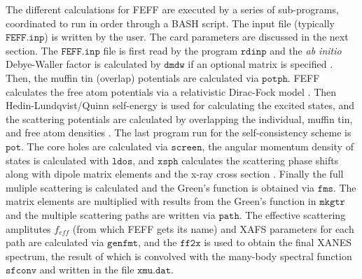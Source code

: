 The different calculations for FEFF are executed by a series of sub-programs, coordinated to run in order through a BASH script. The input file (typically $\texttt{FEFF.inp}$) is written by the user. The card parameters are discussed in the next section. The $\texttt{FEFF.inp}$ file is first read by the program $\texttt{rdinp}$ and the \textit{ab initio} Debye-Waller factor is calculated by $ \texttt{dmdw} $ if an optional matrix is specified \cite{feff-dw}. Then, the muffin tin (overlap) potentials are calculated via $\texttt{potph}$. FEFF calculates the free atom potentials via a relativistic Dirac-Fock model \cite{feff-dirac-fock}. Then Hedin-Lundqvist/Quinn self-energy is used for calculating the excited states, and the scattering potentials are calculated by overlapping the individual, muffin tin, and free atom densities \cite{rehr2009ab}. The last program run for the self-consistency scheme is $ \texttt{pot} $. The core holes are calculated via $ \texttt{screen} $, the angular momentum density of states is calculated with $ \texttt{ldos} $, and $ \texttt{xsph} $ calculates the scattering phase shifts along with dipole matrix elements and the x-ray cross section \cite{feff-mean-free-path}. Finally the full muliple scattering \cite{feff-multiple-scattering} is calculated and the Green's function is obtained via $ \texttt{fms} $. The matrix elements are multiplied with results from the Green's function in $ \texttt{mkgtr} $ and the multiple scattering paths are written via $ \texttt{path} $. The effective scattering amplitutes $ f_{eff} $ (from which FEFF gets its name) and XAFS parameters for each path are calculated via $ \texttt{genfmt} $, and the $ \texttt{ff2x} $ is used to obtain the final XANES spectrum, the result of which is convolved with the many-body spectral function $ \texttt{sfconv} $ and written in the file $ \texttt{xmu.dat} $.     

